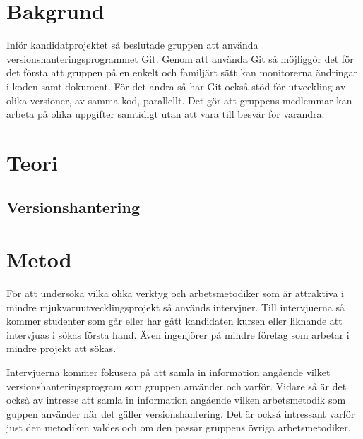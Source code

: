 \vspace{1.5em}
\section{Bakgrund}
Inför kandidatprojektet så beslutade gruppen att använda versionshanteringsprogrammet Git. Genom att använda Git så möjliggör det för det första att gruppen på en enkelt och familjärt sätt kan monitorerna ändringar i koden samt dokument. För det andra så har Git också stöd för utveckling av olika versioner, av samma kod, parallellt. Det gör att gruppens medlemmar kan arbeta på olika uppgifter samtidigt utan att vara till besvär för varandra.

\vspace{1.5em}
\section{Teori}
  \subsection{Versionshantering}


\vspace{1.5em}
\section{Metod}
För att undersöka vilka olika verktyg och arbetsmetodiker som är attraktiva i mindre mjukvaruutvecklingsprojekt så används intervjuer. Till intervjuerna så kommer studenter som går eller har gått kandidaten kursen eller liknande att intervjuas i sökas första hand. Även ingenjörer på mindre företag som arbetar i mindre projekt att sökas.


Intervjuerna kommer fokusera på att samla in information angående vilket versionshanteringsprogram som gruppen använder och varför. Vidare så är det också av intresse att samla in information angående vilken arbetsmetodik som guppen använder när det gäller versionshantering. Det är också intressant varför just den metodiken valdes och om den passar gruppens övriga arbetsmetodiker.

